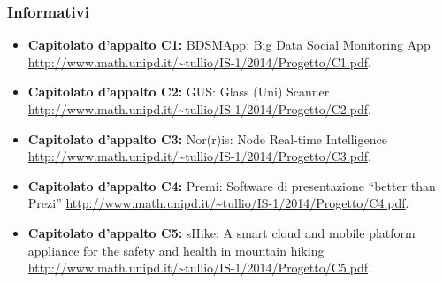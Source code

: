 {{		\subsubsection{Informativi}{
			\begin{itemize}
				\item \textbf{Capitolato d’appalto C1:} BDSMApp: Big Data Social Monitoring App \\
				\url{http://www.math.unipd.it/~tullio/IS-1/2014/Progetto/C1.pdf}.
				\item \textbf{Capitolato d’appalto C2:} GUS: Glass (Uni) Scanner \\
				\url{http://www.math.unipd.it/~tullio/IS-1/2014/Progetto/C2.pdf}.
				\item \textbf{Capitolato d’appalto C3:} Nor(r)is: Node Real-time Intelligence \\
				\url{http://www.math.unipd.it/~tullio/IS-1/2014/Progetto/C3.pdf}.
				\item \textbf{Capitolato d’appalto C4:} Premi: Software di presentazione “better than Prezi”
				\url{http://www.math.unipd.it/~tullio/IS-1/2014/Progetto/C4.pdf}. \\
				\item \textbf{Capitolato d’appalto C5:} sHike: A smart cloud and mobile platform appliance for the safety and health in mountain hiking \\
				\url{http://www.math.unipd.it/~tullio/IS-1/2014/Progetto/C5.pdf}.
			\end{itemize}
			}
		}
	}